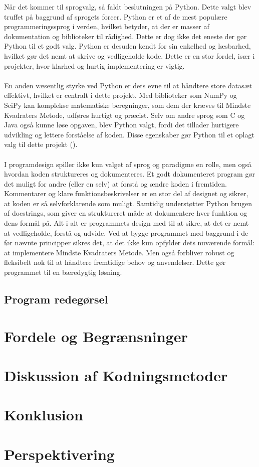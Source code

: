 Når det kommer til sprogvalg, så faldt beslutningen på Python. Dette valgt blev truffet på baggrund af sprogets forcer. Python er et af de mest populære programmeringssprog i verden, hvilket betyder, at der er masser af dokumentation og biblioteker til rådighed. Dette er dog ikke det eneste der gør Python til et godt valg. Python er desuden kendt for sin enkelhed og læsbarhed, hvilket gør det nemt at skrive og vedligeholde kode. Dette er en stor fordel, især i projekter, hvor klarhed og hurtig implementering er vigtig. \\\\
En anden væsentlig styrke ved Python er dets evne til at håndtere store datasæt effektivt, hvilket er centralt i dette projekt. Med biblioteker som NumPy og SciPy kan komplekse matematiske beregninger, som dem der kræves til Mindste Kvadraters Metode, udføres hurtigt og præcist. Selv om andre sprog som C og Java også kunne løse opgaven, blev Python valgt, fordi det tillader hurtigere udvikling og lettere forståelse af koden. Disse egenskaber gør Python til et oplagt valg til dette projekt (\cite{simplilearn}). \\\\
I programdesign spiller ikke kun valget af sprog og paradigme en rolle, men også hvordan koden struktureres og dokumenteres. Et godt dokumenteret program gør det muligt for andre (eller en selv) at forstå og ændre koden i fremtiden. Kommentarer og klare funktionsbeskrivelser er en stor del af designet og sikrer, at koden er så selvforklarende som muligt. Samtidig understøtter Python brugen af docstrings, som giver en struktureret måde at dokumentere hver funktion og dens formål på.
Alt i alt er programmets design med til at sikre, at det er nemt at vedligeholde, forstå og udvide. Ved at bygge programmet med baggrund i de før nævnte principper sikres det, at det ikke kun opfylder dets nuværende formål: at implementere Mindste Kvadraters Metode. Men også forbliver robust og fleksibelt nok til at håndtere fremtidige behov og anvendelser. Dette gør programmet til en bæredygtig løsning.

\subsection{Program redegørsel}

\section{Fordele og Begrænsninger}\label{sec:fordeleOgBegrensninger}

\section{Diskussion af Kodningsmetoder}\label{sec:Kodningsmetoder}

\section{Konklusion}

\section{Perspektivering}
